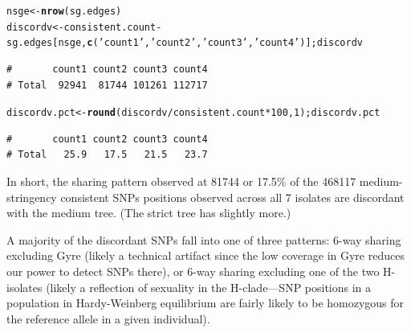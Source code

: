 \documentclass{article}\usepackage[]{graphicx}\usepackage[]{color}
\makeatletter
\newcommand{\hlnum}[1]{\textcolor[rgb]{0.686,0.059,0.569}{#1}}%
\newcommand{\hlstr}[1]{\textcolor[rgb]{0.192,0.494,0.8}{#1}}%
\newcommand{\hlopt}[1]{\textcolor[rgb]{0,0,0}{#1}}%
\newcommand{\hlstd}[1]{\textcolor[rgb]{0.345,0.345,0.345}{#1}}%
\newcommand{\hlkwb}[1]{\textcolor[rgb]{0.69,0.353,0.396}{#1}}%
\newcommand{\hlkwd}[1]{\textcolor[rgb]{0.737,0.353,0.396}{\textbf{#1}}}%
\newenvironment{kframe}{%
 \def\at@end@of@kframe{}%
 \ifinner\ifhmode%
  \def\at@end@of@kframe{\end{minipage}}%
  \begin{minipage}{\columnwidth}%
 \fi\fi%
 \def\FrameCommand##1{\hskip\@totalleftmargin \hskip-\fboxsep
 \colorbox{shadecolor}{##1}\hskip-\fboxsep
     \hskip-\linewidth \hskip-\@totalleftmargin \hskip\columnwidth}%
 \MakeFramed {\advance\hsize-\width
   \@totalleftmargin\z@ \linewidth\hsize
   \@setminipage}}%
 {\par\unskip\endMakeFramed%
 \at@end@of@kframe}
\newenvironment{knitrout}{}{} %
\makeatother
\begin{document}
\begin{knitrout}\scriptsize
{}\color{fgcolor}\begin{kframe}
\begin{alltt}
\hlstd{nsge} \hlkwb{<-} \hlkwd{nrow}\hlstd{(sg.edges)}
\hlstd{discordv} \hlkwb{<-} \hlstd{consistent.count} \hlopt{-} \hlstd{sg.edges[nsge,}\hlkwd{c}\hlstd{(}\hlstr{'count1'}\hlstd{,}\hlstr{'count2'}\hlstd{,}\hlstr{'count3'}\hlstd{,}\hlstr{'count4'}\hlstd{)] ; discordv}
\end{alltt}
\begin{verbatim}
#       count1 count2 count3 count4
# Total  92941  81744 101261 112717
\end{verbatim}
\begin{alltt}
\hlstd{discordv.pct} \hlkwb{<-} \hlkwd{round}\hlstd{(discordv}\hlopt{/}\hlstd{consistent.count}\hlopt{*}\hlnum{100}\hlstd{,}\hlnum{1}\hlstd{) ; discordv.pct}
\end{alltt}
\begin{verbatim}
#       count1 count2 count3 count4
# Total   25.9   17.5   21.5   23.7
\end{verbatim}
\end{kframe}
\end{knitrout}

In short, the sharing pattern observed at 81744 or 17.5\% of the 
468117 medium-stringency consistent SNPs positions observed across all 7 
isolates are discordant with the medium tree.  (The strict tree has slightly more.)  

A majority of the discordant SNPs fall into one of three patterns: 6-way sharing excluding Gyre 
(likely a technical artifact since the low coverage in Gyre reduces our power to detect SNPs there), 
or 6-way sharing excluding one of the two H-isolates (likely a reflection of sexuality in the 
H-clade---SNP positions in a population in Hardy-Weinberg equilibrium are fairly likely to be 
homozygous for the reference allele in a given individual).
\end{document}
